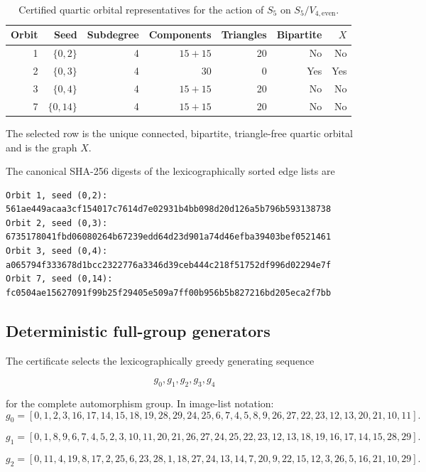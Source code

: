 \begin{table}[h]
\centering
\begin{tabular}{rrrrrrr}
\toprule
Orbit & Seed & Subdegree & Components & Triangles & Bipartite & \(X\)\\
\midrule
1 & $\{0,2\}$ & 4 & $15+15$ & 20 & No & No\\
2 & $\{0,3\}$ & 4 & $30$ & 0 & Yes & Yes\\
3 & $\{0,4\}$ & 4 & $15+15$ & 20 & No & No\\
7 & $\{0,14\}$ & 4 & $15+15$ & 20 & No & No\\
\bottomrule
\end{tabular}
\caption{Certified quartic orbital representatives for the action of
\(S_5\) on \(S_5/V_{4,\mathrm{even}}\).}
\label{tab:quartic-orbital-certificates}
\end{table}

The selected row is the unique connected, bipartite, triangle-free
quartic orbital and is the graph \(X\).

The canonical SHA-256 digests of the lexicographically sorted edge lists
are

\begin{verbatim}
Orbit 1, seed (0,2): 561ae449acaa3cf154017c7614d7e02931b4bb098d20d126a5b796b593138738
Orbit 2, seed (0,3): 6735178041fbd06080264b67239edd64d23d901a74d46efba39403bef0521461
Orbit 3, seed (0,4): a065794f333678d1bcc2322776a3346d39ceb444c218f51752df996d02294e7f
Orbit 7, seed (0,14): fc0504ae15627091f99b25f29405e509a7ff00b956b5b827216bd205eca2f7bb
\end{verbatim}

\subsection{Deterministic full-group generators}

The certificate selects the lexicographically greedy generating sequence

\[
g_0,g_1,g_2,g_3,g_4
\]

for the complete automorphism group. In image-list notation:
\[
g_0
=
\left[
  0, 1, 2, 3, 16, 17, 14, 15, 18, 19,
  28, 29, 24, 25, 6, 7, 4, 5, 8, 9,
  26, 27, 22, 23, 12, 13, 20, 21, 10, 11
\right].
\]

\[
g_1
=
\left[
  0, 1, 8, 9, 6, 7, 4, 5, 2, 3,
  10, 11, 20, 21, 26, 27, 24, 25, 22, 23,
  12, 13, 18, 19, 16, 17, 14, 15, 28, 29
\right].
\]

\[
g_2
=
\left[
  0, 11, 4, 19, 8, 17, 2, 25, 6, 23,
  28, 1, 18, 27, 24, 13, 14, 7, 20, 9,
  22, 15, 12, 3, 26, 5, 16, 21, 10, 29
\right].
\]

